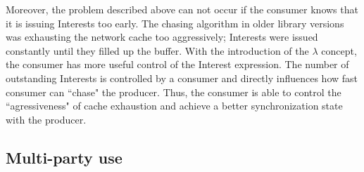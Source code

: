 \documentclass{icn/sig-alternate-2013} %
\begin{document}

Moreover, the problem described above can not occur if the consumer knows that it is issuing Interests too early. The chasing algorithm in older library versions was exhausting the network cache too aggressively; Interests were issued constantly until they filled up the buffer.  With the introduction of the $\lambda$ concept, the consumer has more useful control of the Interest expression. 
The number of outstanding Interests is controlled by a consumer and directly influences how fast consumer can ``chase" the producer. Thus, the consumer is able to control the ``agressiveness" of cache exhaustion and achieve a better synchronization state with the producer.






\subsection{Multi-party use}
\end{document}
